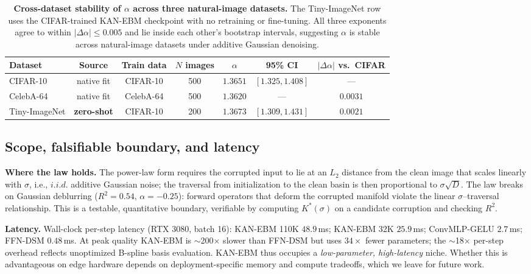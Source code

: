 \documentclass{article}
\begin{document}
\begin{table}[h]
\centering\small
\begin{tabular}{lcccccc}
\toprule
Dataset & Source & Train data & $N$ images & $\alpha$ & 95\% CI & $|\Delta\alpha|$ vs.~CIFAR \\
\midrule
CIFAR-10        & native fit & CIFAR-10  & 500 & $1.3651$ & $[1.325, 1.408]$ & --- \\
CelebA-64       & native fit & CelebA-64 & 500 & $1.3620$ & --- & $0.0031$ \\
Tiny-ImageNet   & \textbf{zero-shot} & CIFAR-10 & 200 & $1.3673$ & $[1.309, 1.431]$ & $0.0021$ \\
\bottomrule
\end{tabular}
\caption{\textbf{Cross-dataset stability of $\alpha$ across three natural-image datasets.} The Tiny-ImageNet row uses the CIFAR-trained KAN-EBM checkpoint with no retraining or fine-tuning. All three exponents agree to within $|\Delta\alpha|{\leq}0.005$ and lie inside each other's bootstrap intervals, suggesting $\alpha$ is stable across natural-image datasets under additive Gaussian denoising.}
\label{tab:cross-dataset}
\end{table}

\subsection{Scope, falsifiable boundary, and latency}
\label{sec:boundary}

\textbf{Where the law holds.} The power-law form requires the corrupted input to lie at an $L_2$ distance from the clean image that scales linearly with $\sigma$, i.e., $i.i.d.$ additive Gaussian noise; the traversal from initialization to the clean basin is then proportional to $\sigma\sqrt{D}$. The law breaks on Gaussian deblurring ($R^2{=}0.54$, $\alpha{=}-0.25$): forward operators that deform the corrupted manifold violate the linear $\sigma$--traversal relationship. This is a testable, quantitative boundary, verifiable by computing $K^*(\sigma)$ on a candidate corruption and checking $R^2$.

\textbf{Latency.} Wall-clock per-step latency (RTX 3080, batch 16): KAN-EBM 110K $48.9$\,ms; KAN-EBM 32K $25.9$\,ms; ConvMLP-GELU $2.7$\,ms; FFN-DSM $0.48$\,ms. At peak quality KAN-EBM is $\sim$200$\times$ slower than FFN-DSM but uses $34{\times}$ fewer parameters; the $\sim$18$\times$ per-step overhead reflects unoptimized B-spline basis evaluation. KAN-EBM thus occupies a \emph{low-parameter, high-latency} niche. Whether this is advantageous on edge hardware depends on deployment-specific memory and compute tradeoffs, which we leave for future work.
\end{document}
